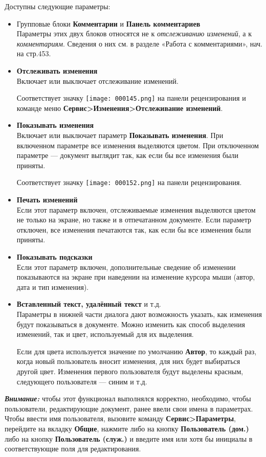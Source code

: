 ﻿\documentclass[a4paper,10pt]{article}
\begin{document}
Доступны следующие параметры:
\begin{itemize}
 \item Групповые блоки \textbf{Комментарии} и \textbf{Панель комментариев}\\
 Параметры этих двух блоков относятся не к \textit{отслеживанию изменений}, а к \textit{комментариям}. Сведения о них см. в разделе «Работа с комментариями», нач. на стр.453.
 \item \textbf{Отслеживать изменения}\\
 Включает или выключает отслеживание изменений.
 
 Соответствует значку \texttt{[image: 000145.png]} на панели рецензирования и команде меню \textbf{Сервис>Изменения>Отслеживание изменений}.
 \item \textbf{Показывать изменения}\\
 Включает или выключает параметр \textbf{Показывать изменения}. При включенном параметре все изменения выделяются цветом. При отключенном параметре — документ выглядит так, как если бы все изменения были приняты.
 
 Соответствует значку \texttt{[image: 000152.png]} на панели рецензирования.
 \item \textbf{Печать изменений}\\
 Если этот параметр включен, отслеживаемые изменения выделяются цветом не только на экране, но также и в отпечатанном документе. Если параметр отключен, все изменения печатаются так, как если бы все изменения были приняты.
 \item \textbf{Показывать подсказки}\\
 Если этот параметр включен, дополнительные сведение об изменении показываются на экране при наведении на изменение курсора мыши (автор, дата и тип изменения).
 \item \textbf{Вставленный текст, удалённый текст} и т.д.\\
 Параметры в нижней части диалога дают возможность указать, как изменения будут показываться в документе. Можно изменить как способ выделения изменений, так и цвет, используемый для их выделения.
 
 Если для цвета используется значение по умолчанию \textbf{Автор}, то каждый раз, когда новый пользователь вносит изменения, для них будет выбираться другой цвет. Изменения первого пользователя будут выделены красным, следующего пользователя — синим и т.д.
\end{itemize}

\begin{mdframed}[backgroundcolor=blue!10]
\textbf{\textit{Внимание:}} чтобы этот функционал выполнялся корректно, необходимо, чтобы пользователи, редактирующие документ, ранее ввели свои имена в параметрах. Чтобы ввести имя пользователя, вызовите команду \textbf{Сервис>Параметры}, перейдите на вкладку \textbf{Общие}, нажмите либо на кнопку \textbf{Пользователь (дом.)} либо на кнопку \textbf{Пользователь (служ.)} и введите имя или хотя бы инициалы в соответствующие поля для редактирования.
\end{mdframed}
\end{document}
